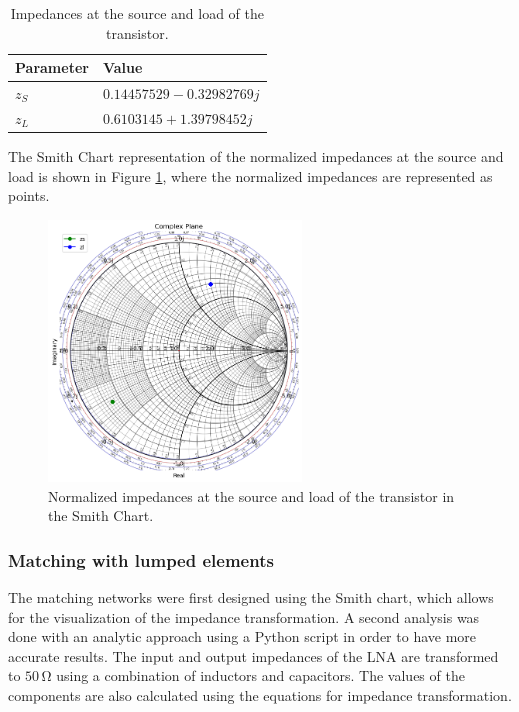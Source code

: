 \begin{table}[H]
    \centering
    \caption{Impedances at the source and load of the transistor.}
    \begin{tabularx}{\textwidth}{>{\centering\arraybackslash}X >{\centering\arraybackslash}X}
        \toprule
        \textbf{Parameter} & \textbf{Value} \\
        \midrule
        $z_{S}$     & $0.14457529-0.32982769j$ \\
        \midrule
        $z_{L}$     & $0.6103145+1.39798452j$\\
        \bottomrule
    \end{tabularx}
    \label{tab:Impedances}
\end{table}

The Smith Chart representation of the normalized impedances at the source and load is shown in Figure \ref{fig:ZsZl}, where the normalized impedances are represented as points.
\begin{figure}[H]
    \centering
    \includegraphics[width=0.6\textwidth]{Images/ZsZl-smithChart.png}
    \caption{Normalized impedances at the source and load of the transistor in the Smith Chart.}
    \label{fig:ZsZl}
\end{figure}



\subsubsection{Matching with lumped elements}

The matching networks were first designed using the Smith chart, which allows for the visualization of the impedance transformation. A second analysis was done with an analytic approach using a Python script in order to have more accurate results. The input and output impedances of the LNA are transformed to $50\,\si{\ohm}$ using a combination of inductors and capacitors. The values of the components are also calculated using the equations for impedance transformation. 

